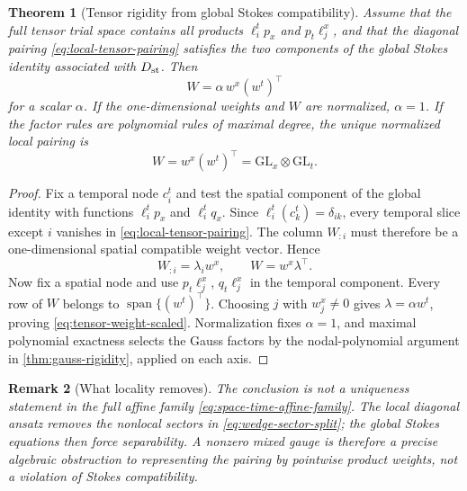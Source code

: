 \documentclass[11pt,a4paper]{article}
\newtheorem{theorem}{Theorem}[section]
\newtheorem{remark}[theorem]{Remark}
\newcommand{\Span}{\operatorname{span}}
\begin{document}
\begin{theorem}[Tensor rigidity from global Stokes compatibility]
\label{thm:tensor-rigidity}
Assume that the full tensor trial space contains all products
\(\ell_i^t p_x\) and \(p_t\ell_j^x\), and that the diagonal pairing
\cref{eq:local-tensor-pairing} satisfies the two components of the global
Stokes identity associated with \(D_{\rm st}\).  Then
\begin{equation}\label{eq:tensor-weight-scaled}
 W=\alpha\,w^x(w^t)^\top
\end{equation}
for a scalar \(\alpha\).  If the one-dimensional weights and \(W\) are
normalized, \(\alpha=1\).  If the factor rules are polynomial rules of
maximal degree, the unique normalized local pairing is
\begin{equation}\label{eq:tensor-weight}
 \boxed{\quad W=w^x(w^t)^\top
 =\mathrm{GL}_x\otimes\mathrm{GL}_t.\quad}
\end{equation}
\end{theorem}

\begin{proof}
Fix a temporal node \(c_i^t\) and test the spatial component of the global
identity with functions \(\ell_i^t p_x\) and \(\ell_i^t q_x\).  Since
\(\ell_i^t(c_k^t)=\delta_{ik}\), every temporal slice except \(i\)
vanishes in \cref{eq:local-tensor-pairing}.  The column \(W_{:i}\) must
therefore be a one-dimensional spatial compatible weight vector.  Hence
\[
 W_{:i}=\lambda_iw^x,
 \qquad W=w^x\lambda^\top.
\]
Now fix a spatial node and use \(p_t\ell_j^x\), \(q_t\ell_j^x\) in the
temporal component.  Every row of \(W\) belongs to
\(\Span\{(w^t)^\top\}\).  Choosing \(j\) with \(w_j^x\ne0\) gives
\(\lambda=\alpha w^t\), proving
\cref{eq:tensor-weight-scaled}.  Normalization fixes \(\alpha=1\), and
maximal polynomial exactness selects the Gauss factors by
the nodal-polynomial argument in \cref{thm:gauss-rigidity}, applied on
each axis.
\end{proof}

\begin{remark}[What locality removes]
The conclusion is not a uniqueness statement in the full affine family
\cref{eq:space-time-affine-family}.  The local diagonal ansatz removes the
nonlocal sectors in \cref{eq:wedge-sector-split}; the global Stokes
equations then force separability.  A nonzero mixed gauge is therefore a
precise algebraic obstruction to representing the pairing by pointwise
product weights, not a violation of Stokes compatibility.
\end{remark}
\end{document}
